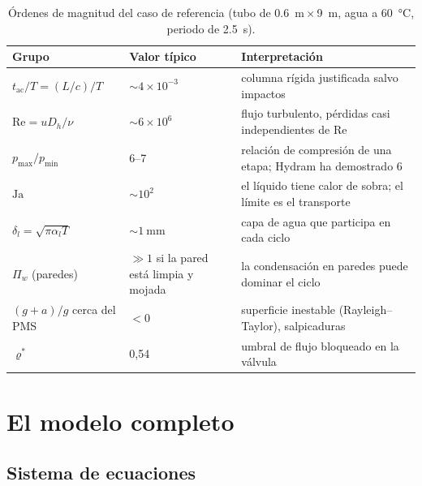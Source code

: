 \documentclass[11pt,a4paper]{article}
\begin{document}
\begin{table}[ht]
\centering\small
\begin{tabularx}{\linewidth}{@{}l l X@{}}
\toprule
Grupo & Valor típico & Interpretación \\
\midrule
$t_{\mathrm{ac}}/T = (L/c)/T$ & $\sim 4\times10^{-3}$ & columna rígida justificada salvo impactos \\
$\mathrm{Re}=uD_h/\nu$ & $\sim 6\times10^{6}$ & flujo turbulento, pérdidas casi independientes de Re \\
$p_{\max}/p_{\min}$ & 6--7 & relación de compresión de una etapa; Hydram ha demostrado 6 \cite{hydramtech} \\
$\mathrm{Ja}$ & $\sim 10^2$ & el líquido tiene calor de sobra; el límite es el transporte \\
$\delta_l=\sqrt{\pi\alpha_l T}$ & $\sim\SI{1}{\milli\metre}$ & capa de agua que participa en cada ciclo \\
$\Pi_w$ (paredes) & $\gg 1$ si la pared está limpia y mojada & la condensación en paredes puede dominar el ciclo \\
$(g+a)/g$ cerca del PMS & $<0$ & superficie inestable (Rayleigh--Taylor), salpicaduras \\
$\varrho^*$ & 0,54 & umbral de flujo bloqueado en la válvula \\
\bottomrule
\end{tabularx}
\caption{Órdenes de magnitud del caso de referencia (tubo de \SI{0.6}{\metre}\,$\times$\,\SI{9}{\metre}, agua a \SI{60}{\celsius}, periodo de \SI{2.5}{\second}).}
\end{table}

\section{El modelo completo}

\subsection{Sistema de ecuaciones}
\end{document}
